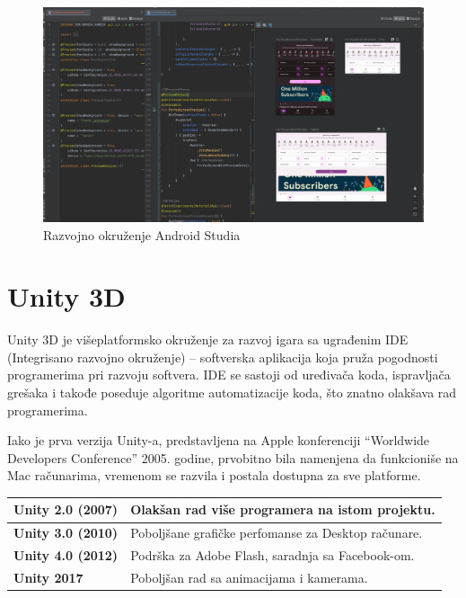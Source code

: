 \documentclass[12pt]{article}
\begin{document}
\begin{figure}[ht!]
    \centering
    \includegraphics[scale=0.25]{android_studio_interface.png}
    \caption{Razvojno okruženje Android Studia}
\end{figure}
\pagebreak

\section{Unity 3D}

Unity 3D je višeplatformsko okruženje za razvoj igara sa ugrađenim IDE (Integrisano razvojno okruženje) – softverska aplikacija koja pruža pogodnosti programerima pri razvoju softvera. IDE se sastoji od uređivača koda, ispravljača grešaka i takođe poseduje algoritme automatizacije koda, što 
znatno olakšava rad programerima.

Iako je prva verzija Unity-a, predstavljena na Apple konferenciji “Worldwide Developers Conference” 2005. godine, prvobitno bila namenjena da funkcioniše na Mac računarima, vremenom se razvila i postala dostupna za sve platforme. 

\begin{table}[ht!]
\begin{tabular}{|l|l|}
\hline
\multicolumn{1}{|c|}{\textbf{Unity 2.0 (2007)}} & Olakšan rad više programera na istom projektu.\\ \hline
\textbf{Unity 3.0 (2010)}                       & Poboljšane grafičke perfomanse za Desktop računare.                               \\ \hline
\textbf{Unity 4.0 (2012)}                       & Podrška za Adobe Flash, saradnja sa Facebook-om. \\ \hline
\textbf{Unity 2017}                             & Poboljšan rad sa animacijama i kamerama. \\ \hline
\end{tabular}
\end{table}
\end{document}
